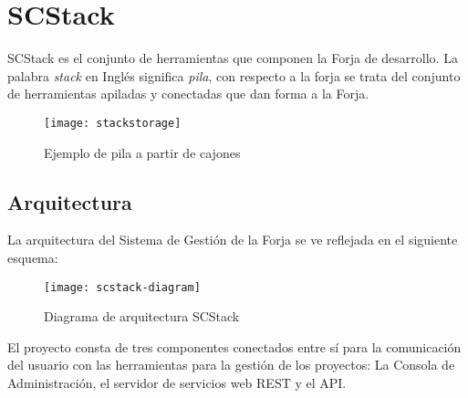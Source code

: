 %
% 


\chapter{SCStack}
\label{chap:scstack}

\par SCStack es el conjunto de herramientas que componen la Forja de desarrollo. La palabra \emph{stack} en Inglés significa \emph{pila}, con respecto a la forja se trata del conjunto de herramientas apiladas y conectadas que dan forma a la Forja.

\begin{figure}[H]
    \centering
    \texttt{[image: stackstorage]}
    \caption{Ejemplo de pila a partir de cajones}
    \label{fig:stackstorage}
\end{figure}

\section{Arquitectura}
\label{sec:arquitectura}

\par La arquitectura del Sistema de Gestión de la Forja se ve reflejada en el siguiente esquema:

\begin{figure}[H]
    \centering
    \texttt{[image: scstack-diagram]}
    \caption{Diagrama de arquitectura SCStack}
    \label{fig:scstack-diagram}
\end{figure}

\par El proyecto consta de tres componentes conectados entre sí para la comunicación del usuario con las herramientas para la gestión de los proyectos: La Consola de Administración, el servidor de servicios web REST y el API.


